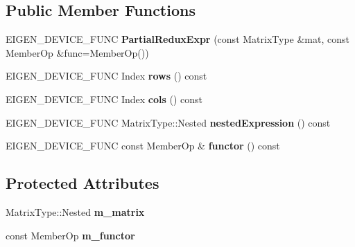 \subsection*{Public Member Functions}
\begin{DoxyCompactItemize}
\item 
\mbox{\label{class_eigen_1_1_partial_redux_expr_a54f6a90b0ae45dc88105b4a57f940f77}} 
E\+I\+G\+E\+N\+\_\+\+D\+E\+V\+I\+C\+E\+\_\+\+F\+U\+NC {\bfseries Partial\+Redux\+Expr} (const Matrix\+Type \&mat, const Member\+Op \&func=Member\+Op())
\item 
\mbox{\label{class_eigen_1_1_partial_redux_expr_a518f32495c8bd341041def7acac1a270}} 
E\+I\+G\+E\+N\+\_\+\+D\+E\+V\+I\+C\+E\+\_\+\+F\+U\+NC Index {\bfseries rows} () const
\item 
\mbox{\label{class_eigen_1_1_partial_redux_expr_a61b6b938dc8ac08690ae5bf3783be910}} 
E\+I\+G\+E\+N\+\_\+\+D\+E\+V\+I\+C\+E\+\_\+\+F\+U\+NC Index {\bfseries cols} () const
\item 
\mbox{\label{class_eigen_1_1_partial_redux_expr_a3e982081f3b64703c27ceaf9dde199af}} 
E\+I\+G\+E\+N\+\_\+\+D\+E\+V\+I\+C\+E\+\_\+\+F\+U\+NC Matrix\+Type\+::\+Nested {\bfseries nested\+Expression} () const
\item 
\mbox{\label{class_eigen_1_1_partial_redux_expr_a808c46ed63ea5d7bb317cdaf03855325}} 
E\+I\+G\+E\+N\+\_\+\+D\+E\+V\+I\+C\+E\+\_\+\+F\+U\+NC const Member\+Op \& {\bfseries functor} () const
\end{DoxyCompactItemize}
\subsection*{Protected Attributes}
\begin{DoxyCompactItemize}
\item 
\mbox{\label{class_eigen_1_1_partial_redux_expr_a0e168dd87be83384815da314455aa177}} 
Matrix\+Type\+::\+Nested {\bfseries m\+\_\+matrix}
\item 
\mbox{\label{class_eigen_1_1_partial_redux_expr_a132cd0b41217ad9218185eb0410aa4cc}} 
const Member\+Op {\bfseries m\+\_\+functor}
\end{DoxyCompactItemize}


